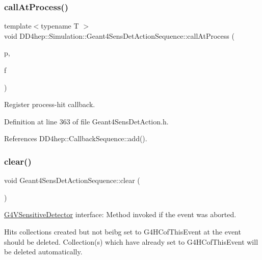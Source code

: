 \subsubsection{\texorpdfstring{call\+At\+Process()}{callAtProcess()}}
{\footnotesize\ttfamily template$<$typename T $>$ \\
void D\+D4hep\+::\+Simulation\+::\+Geant4\+Sens\+Det\+Action\+Sequence\+::call\+At\+Process (\begin{DoxyParamCaption}\item[{\hyperlink{class_t}{T} $\ast$}]{p,  }\item[{void(T\+::$\ast$)(G4\+Step $\ast$, G4\+Touchable\+History $\ast$)}]{f }\end{DoxyParamCaption})\hspace{0.3cm}{\ttfamily [inline]}}



Register process-\/hit callback. 



Definition at line 363 of file Geant4\+Sens\+Det\+Action.\+h.



References D\+D4hep\+::\+Callback\+Sequence\+::add().

\hypertarget{class_d_d4hep_1_1_simulation_1_1_geant4_sens_det_action_sequence_ab2bab9282950af33d3e14e3f0d5864fd}{}\label{class_d_d4hep_1_1_simulation_1_1_geant4_sens_det_action_sequence_ab2bab9282950af33d3e14e3f0d5864fd} 
\subsubsection{\texorpdfstring{clear()}{clear()}}
{\footnotesize\ttfamily void Geant4\+Sens\+Det\+Action\+Sequence\+::clear (\begin{DoxyParamCaption}{ }\end{DoxyParamCaption})\hspace{0.3cm}{\ttfamily [virtual]}}



\hyperlink{class_g4_v_sensitive_detector}{G4\+V\+Sensitive\+Detector} interface\+: Method invoked if the event was aborted. 

Hits collections created but not beibg set to G4\+H\+Cof\+This\+Event at the event should be deleted. Collection(s) which have already set to G4\+H\+Cof\+This\+Event will be deleted automatically.

